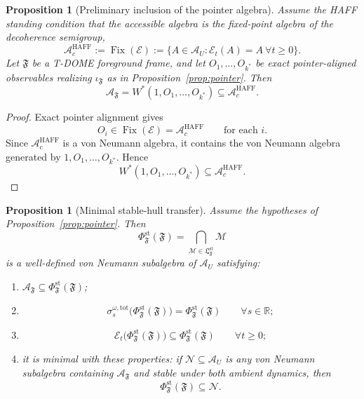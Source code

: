 \documentclass[12pt]{article}
\newtheorem{proposition}[theorem]{Proposition}
\theoremstyle{definition}
\theoremstyle{remark}
\begin{document}
\begin{proposition}[Preliminary inclusion of the pointer algebra]\label{prop:prelim_inclusion}
Assume the HAFF standing condition that the accessible algebra is the
fixed-point algebra of the decoherence semigroup,
\[
\mathcal A_c^{\mathrm{HAFF}}
:=
\operatorname{Fix}(\mathcal E)
:=
\{A\in\mathcal A_U:\mathcal E_t(A)=A\ \forall t\ge 0\}.
\]
Let \(\mathfrak F\) be a T-DOME foreground frame, and let
\(O_1,\dots,O_{k^*}\) be exact pointer-aligned observables realizing
\(\iota_{\mathfrak F}\) as in
Proposition~\ref{prop:pointer}. Then
\[
\mathcal A_{\mathfrak F}
=
W^*(1,O_1,\dots,O_{k^*})
\subseteq
\mathcal A_c^{\mathrm{HAFF}}.
\]
\end{proposition}

\begin{proof}
Exact pointer alignment gives
\[
O_i\in \operatorname{Fix}(\mathcal E)=\mathcal A_c^{\mathrm{HAFF}}
\qquad
\text{for each } i.
\]
Since \(\mathcal A_c^{\mathrm{HAFF}}\) is a von Neumann algebra, it
contains the von Neumann algebra generated by \(1,O_1,\dots,O_{k^*}\).
Hence
\[
W^*(1,O_1,\dots,O_{k^*})\subseteq \mathcal A_c^{\mathrm{HAFF}}.
\]
\end{proof}

\begin{proposition}[Minimal stable-hull transfer]\label{prop:stablehull}
Assume the hypotheses of Proposition~\ref{prop:pointer}. Then
\[
\Phi_{\mathfrak F}^{\mathrm{st}}(\mathfrak F)
=
\bigcap_{\mathcal M\in \mathfrak L_{\mathfrak F}^{\mathrm{st}}}\mathcal M
\]
is a well-defined von Neumann subalgebra of \(\mathcal A_U\) satisfying:
\begin{enumerate}
\item \(\mathcal A_{\mathfrak F}\subseteq
  \Phi_{\mathfrak F}^{\mathrm{st}}(\mathfrak F)\);
\item
  \[
  \sigma_s^{\omega,\mathrm{tot}}
  \big(\Phi_{\mathfrak F}^{\mathrm{st}}(\mathfrak F)\big)
  =
  \Phi_{\mathfrak F}^{\mathrm{st}}(\mathfrak F)
  \qquad
  \forall s\in\mathbb R;
  \]
\item
  \[
  \mathcal E_t\big(\Phi_{\mathfrak F}^{\mathrm{st}}(\mathfrak F)\big)
  \subseteq
  \Phi_{\mathfrak F}^{\mathrm{st}}(\mathfrak F)
  \qquad
  \forall t\ge 0;
  \]
\item it is minimal with these properties: if
  \(\mathcal N\subseteq\mathcal A_U\) is any von Neumann subalgebra
  containing \(\mathcal A_{\mathfrak F}\) and stable under both ambient
  dynamics, then
  \[
  \Phi_{\mathfrak F}^{\mathrm{st}}(\mathfrak F)\subseteq \mathcal N.
  \]
\end{enumerate}
\end{proposition}
\end{document}
